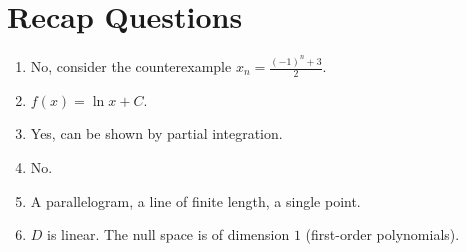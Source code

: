 \documentclass{article}
\begin{document}

\section{Recap Questions}
\begin{enumerate}
    \item No, consider the counterexample $x_n = \frac{(-1)^n + 3}{2}$.
    \item $f(x) = \ln x + C$.
    \item Yes, can be shown by partial integration. 
    \item No. 
    \item A parallelogram, a line of finite length, a single point. 
    \item $D$ is linear. The null space is of dimension $1$ (first-order polynomials). 
\end{enumerate}
\end{document}
